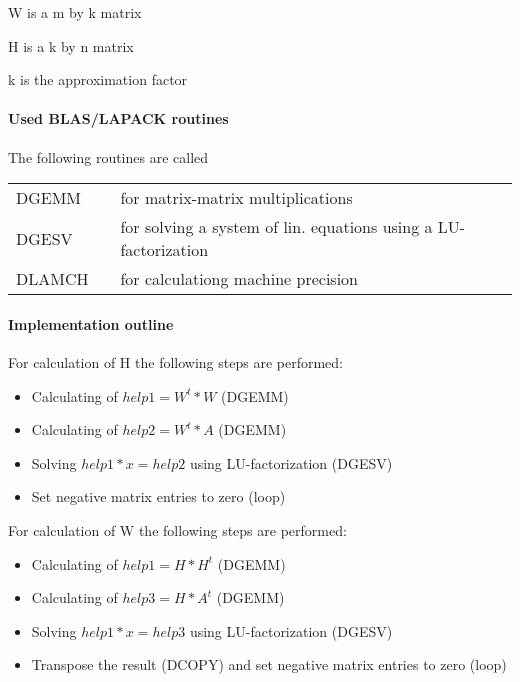 \documentclass[a4paper,10pt]{scrartcl}
\begin{document}
 					W is a m by k matrix

 					H is a k by n matrix

 					k is the approximation factor


			\paragraph{Used BLAS/LAPACK routines}

					The following routines are called\newline

					\begin{tabular}{lcl}
						DGEMM && for matrix-matrix multiplications\\
						DGESV && for solving a system of lin. equations using a 
							LU-factorization\\
						DLAMCH && for calculationg machine precision
					\end{tabular}

			\paragraph{Implementation outline}


					For calculation of H the following steps are performed:\newline

					\begin{itemize}
					 \item Calculating of $help1 = W^t * W$ (DGEMM)\newline
					 \item Calculating of $help2 = W^t * A$ (DGEMM)\newline
					 \item Solving $help1 * x = help2$ using LU-factorization (DGESV)\newline
					 \item Set negative matrix entries to zero (loop)\newline
					\end{itemize}


					For calculation of W the following steps are performed:\newline
					
					\begin{itemize}
					 \item Calculating of $help1 = H * H^t$ (DGEMM)\newline
					 \item Calculating of $help3 = H * A^t$ (DGEMM)\newline
					 \item Solving $help1 * x = help3$ using LU-factorization (DGESV)\newline
					 \item Transpose the result (DCOPY) and set negative matrix entries to 
						zero (loop)\newline
					\end{itemize}
\end{document}
